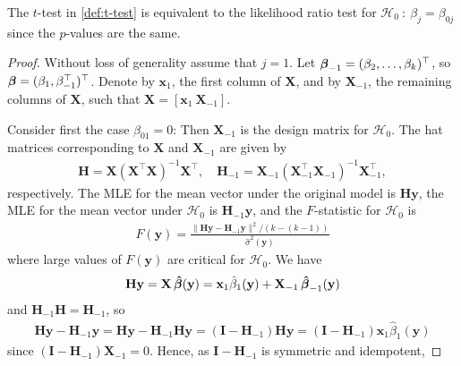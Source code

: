 \begin{theorem}
    The $t$-test in \eqref{def:t-test} is equivalent to the likelihood ratio test for $\mathcal{H}_0 \ : \ \beta_j = \beta_{0j}$ since the $p$-values are the same.
\end{theorem}
\begin{proof}
    Without loss of generality assume that $j = 1$.
    Let $\operatorname{\boldsymbol{\beta}}_{-1} = (\beta_2, \ldots, \beta_k)^\top$, so $\operatorname{\boldsymbol{\beta}} = (\beta_1, \beta_{-1}^\top)^\top$.
    Denote by $\textbf{x}_1$, the first column of $\textbf{X}$, and by $\textbf{X}_{-1}$, the remaining columns of $\textbf{X}$, such that $\textbf{X} = \left[\textbf{x}_1 \ \textbf{X}_{-1}\right]$.
    
    Consider first the case $\beta_{01} = 0$: Then $\textbf{X}_{-1}$ is the design matrix for $\mathcal{H}_0$.
    The hat matrices corresponding to $\textbf{X}$ and $\textbf{X}_{-1}$ are given by
    \begin{align*}
        \textbf{H} = \textbf{X}(\textbf{X}^\top\textbf{X})^{-1}\textbf{X}^\top, \quad \mathbf{H}_{-1} = \textbf{X}_{-1}(\textbf{X}^\top_{-1}\textbf{X}_{-1})^{-1}\textbf{X}^\top_{-1},
    \end{align*}
    respectively.
    The MLE for the mean vector under the original model is $\textbf{H}\textbf{y}$, the MLE for the mean vector under $\mathcal{H}_0$ is $\textbf{H}_{-1}\textbf{y}$, and the $F$-statistic for $\mathcal{H}_0$ is
    \begin{align*}
        F(\textbf{y}) = \frac{\|\textbf{H}\textbf{y} - \textbf{H}_{-1}\textbf{y}\|^2/(k-(k-1))}{\hat{\sigma}^2(\textbf{y})}
    \end{align*}
    where large values of $F(\textbf{y})$ are critical for $\mathcal{H}_0$.
    We have
    \begin{align*}
        \textbf{H}\textbf{y} = \textbf{X}\operatorname{\boldsymbol{\hat{\beta}}}(\textbf{y}) = \textbf{x}_1\hat{\beta}_1(\textbf{y}) + \textbf{X}_{-1} \operatorname{\boldsymbol{\hat{\beta}}}_{-1}(\textbf{y})
    \end{align*}
    and $\textbf{H}_{-1}\textbf{H} = \textbf{H}_{-1}$, so
    \begin{align*}
        \textbf{H}\textbf{y}-\textbf{H}_{-1}\textbf{y} = 
        \textbf{H}\textbf{y}-\textbf{H}_{-1}\textbf{H}\textbf{y} =
        (\textbf{I} - \textbf{H}_{-1})\textbf{H}\textbf{y} = 
        (\textbf{I} - \textbf{H}_{-1})\textbf{x}_1\hat{\beta}_1(\textbf{y})
    \end{align*}
    since $(\textbf{I} - \textbf{H}_{-1})\textbf{X}_{-1} = 0$.
    Hence, as $\textbf{I} - \textbf{H}_{-1}$ is symmetric and idempotent,

\end{proof}
